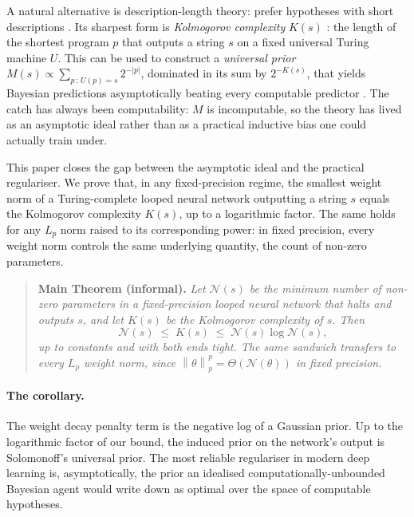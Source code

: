 \documentclass{article}
\theoremstyle{definition}
\newcommand{\norm}[1]{\left\lVert#1\right\rVert}
\newcommand{\nc}{\mathcal{N}}
\begin{document}
A natural alternative is description-length theory: prefer hypotheses with
short descriptions \citep{rissanen1978modeling,grunwald2007mdl}. Its sharpest
form is \emph{Kolmogorov complexity} $K(s)$
\citep{kolmogorov1965three,solomonoff1964formal,chaitin1969length}: the length
of the shortest program $p$ that outputs a string $s$ on a fixed universal
Turing machine $U$. This can be used to construct a \emph{universal prior} $M(s) \propto
  \sum_{p\,:\,U(p)=s} 2^{-|p|}$, dominated in its sum by $2^{-K(s)}$, that
yields Bayesian predictions asymptotically beating every computable predictor
\citep{solomonoff1964formal,hutter2005universal,legg2007universal}. The catch
has always been computability: $M$ is incomputable, so the theory has lived as
an asymptotic ideal rather than as a practical inductive bias one could
actually train under.

This paper closes the gap between the asymptotic ideal and the practical
regulariser. We prove that, in any fixed-precision regime, the smallest weight
norm of a Turing-complete looped neural network outputting a string $s$ equals
the Kolmogorov complexity $K(s)$, up to a logarithmic factor. The same holds
for any $L_p$ norm raised to its corresponding power: in fixed precision, every
weight norm controls the same underlying quantity, the count of non-zero
parameters.

\newpage
\begin{quote}
  \textbf{Main Theorem (informal).} \emph{Let $\nc(s)$ be the minimum number of non-zero parameters in a fixed-precision looped neural network that halts and outputs $s$, and let $K(s)$ be the Kolmogorov complexity of $s$. Then
    \[
      \nc(s) \;\le\; K(s) \;\le\; \nc(s) \log \nc(s),
    \]
    up to constants and with both ends tight. The same sandwich transfers to every
    $L_p$ weight norm, since $\norm{\theta}_p^p = \Theta(\nc(\theta))$ in fixed
    precision.}
\end{quote}

\paragraph{The corollary.} The weight decay penalty term is the negative log of a Gaussian prior. Up to
the logarithmic factor of our bound, the induced prior on the network's output
is Solomonoff's universal prior. The most reliable regulariser in modern deep
learning is, asymptotically, the prior an idealised computationally-unbounded
Bayesian agent would write down as optimal over the space of computable
hypotheses.
\end{document}
